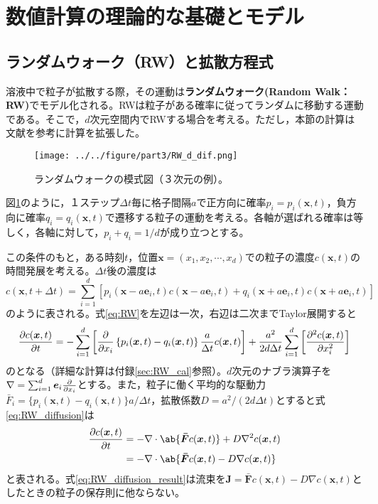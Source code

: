\documentclass[autodetect-engine,dvi=dvipdfmx,a4paper,ja=standard,oneside,openany]{bxjsbook}
\begin{document}
\section{数値計算の理論的な基礎とモデル}
\subsection{ランダムウォーク（RW）と拡散方程式}
\label{sec:RW}
溶液中で粒子が拡散する際，その運動は\textbf{ランダムウォーク(Random Walk：RW)}でモデル化される。RWは粒子がある確率に従ってランダムに移動する運動である。そこで，$d$次元空間内でRWする場合を考える。ただし，本節の計算は文献\cite{フラクタル科学}\cite{フラクタルの物理Ⅱ}を参考に計算を拡張した。
\begin{figure}[htbp]
  \centering
  \texttt{[image: ../../figure/part3/RW\_d\_dif.png]}
  \caption{ランダムウォークの模式図（３次元の例）。}
  \label{fig:random_walk}
\end{figure}
図\ref{fig:random_walk}のように，１ステップ$\Delta t$毎に格子間隔$a$で正方向に確率$p_i=p_i(\bm{x},t)$，負方向に確率$q_i=q_i(\bm{x},t)$で遷移する粒子の運動を考える。各軸が選ばれる確率は等しく，各軸に対して，$p_i+q_i=1/d$が成り立つとする。

この条件のもと，ある時刻$t$，位置$\bm{x}=(x_1,x_2,\cdots,x_d)$での粒子の濃度$c(\bm{x},t)$の時間発展を考える。$\Delta t$後の濃度は
\begin{equation}
  c(\bm{x},t+\Delta t)=\sum_{i=1}^{d}\left[p_i(\bm{x}-a\bm{e}_i,t) c(\bm{x}-a\bm{e}_i,t)+q_i(\bm{x}+a\bm{e}_i,t) c(\bm{x}+a\bm{e}_i,t)\right]
  \label{eq:RW}
\end{equation}
のように表される。式\eqref{eq:RW}を左辺は一次，右辺は二次までTaylor展開すると
\begin{equation}
  \pdv{c(\bm{x},t)}{t}=-\sum_{i=1}^{d}\left[\pdv*{\left\{p_i(\bm{x},t)-q_i(\bm{x},t)\right\}\frac{a}{\Delta t}c(\bm{x},t)}{x_i}\right]+\frac{a^2}{2d\Delta t}\sum_{i=1}^{d}\left[\pdv[2]{c(\bm{x},t)}{x_i}\right]
  \label{eq:RW_diffusion}
\end{equation}
のとなる（詳細な計算は付録\ref{sec:RW_cal}参照）。$d$次元のナブラ演算子を$\nabla=\sum_{i=1}^{d}\bm{e}_i\pdv*{}{x_i}$とする。また，粒子に働く平均的な駆動力$\bar{F}_i=\{p_i(\bm{x},t)-q_i(\bm{x},t)\}a/\Delta t$，拡散係数$D=a^2/(2d\Delta t)$とすると式\eqref{eq:RW_diffusion}は
\begin{equation}
  \begin{split}
    \pdv{c(\bm{x},t)}{t} & =-\nabla\cdot\ab\{ \bm{\bar{F}}c(\bm{x},t)\}+D\nabla^2 c(\bm{x},t) \\
                         & =-\nabla\cdot\ab\{\bm{\bar{F}}c(\bm{x},t)-D\nabla c(\bm{x},t)\}
  \end{split}
  \label{eq:RW_diffusion_result}
\end{equation}
と表される。式\eqref{eq:RW_diffusion_result}は流束を$\bm{J}=\bm{\bar{F}}c(\bm{x},t)-D\nabla c(\bm{x},t)$としたときの粒子の保存則に他ならない。
\end{document}
